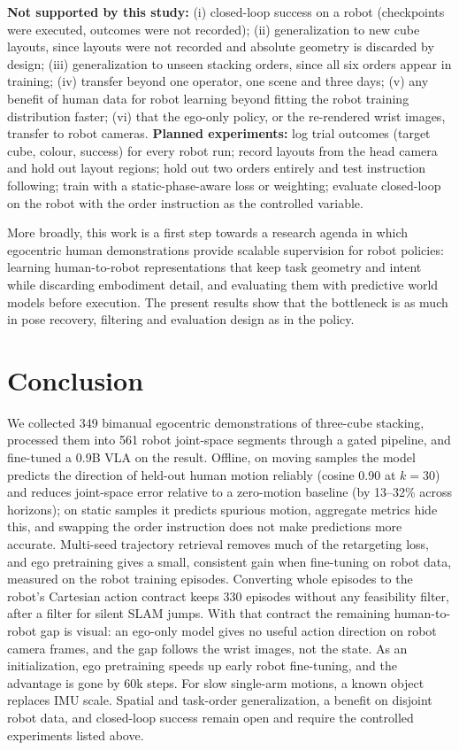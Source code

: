 \documentclass[conference,10pt]{IEEEtran}
\begin{document}
\textbf{Not supported by this study:} (i) closed-loop success on a robot (checkpoints were executed, outcomes were not recorded); (ii) generalization to new cube layouts, since layouts
were not recorded and absolute geometry is discarded by design; (iii) generalization to unseen stacking orders, since all six
orders appear in training; (iv) transfer beyond one operator, one scene and three days; (v) any benefit of human data for robot learning beyond fitting the robot training distribution faster; (vi) that the
ego-only policy, or the re-rendered wrist images, transfer to robot cameras. \textbf{Planned experiments:} log trial outcomes
(target cube, colour, success) for every robot run; record layouts from the head camera and hold out layout regions; hold out two orders
entirely and test instruction following; train with a static-phase-aware loss or weighting; evaluate closed-loop on the robot
with the order instruction as the controlled variable.

More broadly, this work is a first step towards a research agenda in which egocentric human demonstrations provide scalable
supervision for robot policies: learning human-to-robot representations that keep task geometry and intent while discarding
embodiment detail, and evaluating them with predictive world models before execution. The present results show that the
bottleneck is as much in pose recovery, filtering and evaluation design as in the policy.

\section{Conclusion}
We collected 349 bimanual egocentric demonstrations of three-cube stacking, processed them into 561 robot joint-space segments
through a gated pipeline, and fine-tuned a 0.9B VLA on the result. Offline, on moving samples the model predicts the
direction of held-out human motion reliably (cosine 0.90 at $k{=}30$) and reduces joint-space error relative to a zero-motion
baseline (by 13--32\% across horizons); on static samples it predicts spurious motion, aggregate metrics hide this, and
swapping the order instruction does not make predictions more accurate. Multi-seed trajectory retrieval removes much of the
retargeting loss, and ego pretraining gives a small, consistent gain when fine-tuning on robot data, measured on the robot
training episodes. Converting whole episodes to the robot's Cartesian action contract keeps 330 episodes without any
feasibility filter, after a filter for silent SLAM jumps. With that contract the remaining human-to-robot gap is visual: an
ego-only model gives no useful action direction on robot camera frames, and the gap follows the wrist images, not the state.
As an initialization, ego pretraining speeds up early robot fine-tuning, and the advantage is gone by 60k steps. For slow
single-arm motions, a known object replaces IMU scale. Spatial and task-order generalization, a benefit on disjoint robot
data, and closed-loop success remain open and require the controlled experiments listed above.
\end{document}
